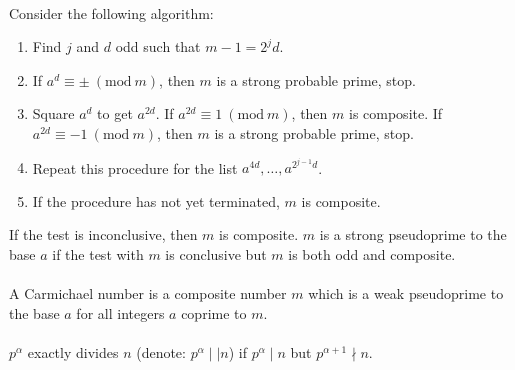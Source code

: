 \documentclass[12pt]{article}
\theoremstyle{definition}
\theoremstyle{named}
\newcommand{\Mod}[1]{\ (\mathrm{mod}\ #1)}
\begin{document}
\\
Consider the following algorithm: \\
\begin{enumerate}
    \item Find $j$ and $d$ odd such that $m-1 = 2^jd$. 
    \item If $a^d \equiv \pm \Mod{m}$, then $m$ is a strong probable prime, stop. 
    \item Square $a^d$ to get $a^{2d}$. If $a^{2d} \equiv 1 \Mod{m}$, then $m$ is composite. If $a^{2d} \equiv -1 \Mod{m}$, then $m$ is a strong probable prime, stop. 
    \item Repeat this procedure for the list $a^{4d}, \dots, a^{2^{j-1}d}$. 
    \item If the procedure has not yet terminated, $m$ is composite. 
\end{enumerate}
If the test is inconclusive, then $m$ is composite. $m$ is a strong pseudoprime to the base $a$ if the test with $m$ is conclusive but $m$ is both odd and composite. 
\\
\\
A Carmichael number is a composite number $m$ which is a weak pseudoprime to the base $a$ for all integers $a$ coprime to $m$. 
\\
\\
$p^\alpha$ exactly divides $n$ (denote: $p^\alpha \mid\mid n$) if $p^\alpha \mid n$ but $p^{\alpha + 1} \nmid n$. 
\end{document}
